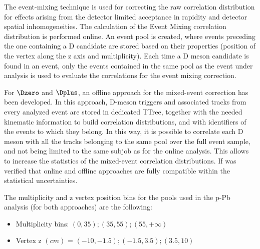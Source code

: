 %
\label{MEsection}
The event-mixing technique is used for correcting the raw correlation distribution for effects arising
from the detector limited acceptance in rapidity and detector spatial inhomogeneities. The calculation of the Event
Mixing correlation distribution is performed online. %
An event pool is created, where events preceding the one containing a D candidate are stored based on their properties (position of the vertex along the z axis and multiplicity).
Each time a D meson candidate is found in an event, only the events contained in the same pool as the event under analysis is used to evaluate the correlations for the event mixing correction.%

For $\Dzero$ and $\Dplus$, an offline approach for the mixed-event correction has been developed. In this approach, D-meson triggers and associated tracks from every analyzed event are stored in dedicated TTree, together with the needed kinematic information to build correlation distributions, and with identifiers of the events to which they belong. In this way, it is possible to correlate each D meson with all the tracks belonging to the same pool over the full event sample, and not being limited to the same subjob as for the online analysis. This allows to increase the statistics of the mixed-event correlation distributions. If was verified that online and offline approaches are fully compatible within the statistical uncertainties.

The multiplicity and z vertex position bins for the pools used in the p-Pb analysis (for both approaches) are the following:
\begin{itemize}
\item Multiplicity bins: $\left(0,35\right);\left(35,55\right);\left(55,+\infty\right)$
\item Vertex z $(cm)$ = $\left(-10,-1.5\right);\left(-1.5,3.5\right);\left(3.5,10\right)$
\end{itemize}

